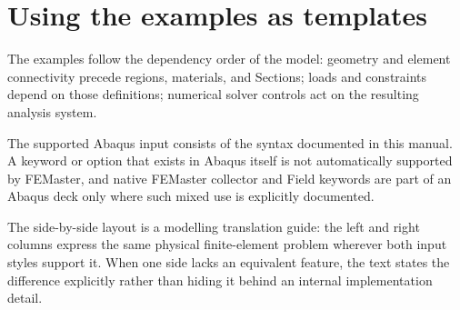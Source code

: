 \section{Using the examples as templates}

The examples follow the dependency order of the model: geometry and element connectivity precede regions, materials, and Sections; loads and constraints depend on those definitions; numerical solver controls act on the resulting analysis system.

The supported Abaqus input consists of the syntax documented in this manual. A keyword or option that exists in Abaqus itself is not automatically supported by FEMaster, and native FEMaster collector and Field keywords are part of an Abaqus deck only where such mixed use is explicitly documented.

The side-by-side layout is a modelling translation guide: the left and right columns express the same physical finite-element problem wherever both input styles support it. When one side lacks an equivalent feature, the text states the difference explicitly rather than hiding it behind an internal implementation detail.
